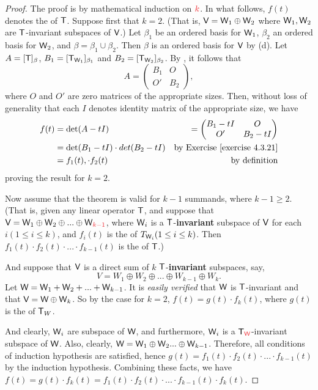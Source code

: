\begin{proof}
The proof is by mathematical induction on \(\RED{k}\).
In what follows, \(f(t)\) denotes the \CPOLY{} of \(\textsf{T}\).
Suppose first that \(k = 2\).
(That is, \(\textsf{V} = \textsf{W}_1 \oplus \textsf{W}_2\) where \(\textsf{W}_1, \textsf{W}_2\) are \(\textsf{T}\)-invariant subspaces of \(\textsf{V}\).)
Let \(\beta_1\) be an ordered basis for \(\textsf{W}_1\), \(\beta_2\) an ordered basis for \(\textsf{W}_2\), and \(\beta = \beta_1 \cup \beta_2\).
Then \(\beta\) is an ordered basis for \(\textsf{V}\) by (d).
Let \(A = [\textsf{T}]_{\beta}\), \(B_1 = [\textsf{T}_{\textsf{W}_1}]_{\beta_1}\) and \(B_2 = [\textsf{T}_{\textsf{W}_2}]_{\beta_2}\).
By , it follows that
\[
    A = \begin{pmatrix}
        B_1 & O \\
        O' & B_2
    \end{pmatrix},
\]
where \(O\) and \(O'\) are zero matrices of the appropriate sizes.
Then, without loss of generality that each \(I\) denotes identity matrix of the appropriate size, we have
\begin{align*}
    f(t) & = \det(A - tI) & = \begin{pmatrix} B_1 - tI & O \\ O' & B_2 - tI \end{pmatrix}\\
         & = \det(B_1 - tI) \cdot det(B_2 - tI) & \text{by \EXEC{4.3.21}} \\
         & = f_1(t), \cdot f_2(t) & \text{by definition}
\end{align*}
proving the result for \(k = 2\).

Now assume that the theorem is valid for \(k - 1\) summands, where \(k - 1 \ge 2\).
(That is, given any linear operator \(\textsf{T}\), and suppose that \(\V = \W_1 \oplus \W_2 \oplus ... \oplus \W_{\RED{k - 1}}\), where \(\textsf{W}_i\) is a \(\textsf{T}\)-\textbf{invariant} subspace of \(\textsf{V}\) for each \(i (1 \le i \le k)\), and \(f_i(t)\) is the \CPOLY{} of \(T_{\textsf{W}_i} (1 \le i \le k)\).
Then \(f_1(t) \cdot f_2(t) \cdot ... \cdot f_{k - 1}(t)\) is the \CPOLY{} of \(\textsf{T}\).)

And suppose that \(\textsf{V}\) is a direct sum of \(k\) \(\textsf{T}\)-\textbf{invariant}\RED{*} subspaces, say,
\[
    V = W_1 \oplus W_2 \oplus ... \oplus W_{k - 1} \oplus W_k.
\]
Let \(\textsf{W} = \textsf{W}_1 + \textsf{W}_2 + ... + \textsf{W}_{k - 1}\).
It is \emph{easily verified} that \(\textsf{W}\) is \(\textsf{T}\)-invariant and that \(\textsf{V} = \textsf{W} \oplus \textsf{W}_k\).
So by the case for \(k = 2\), \(f(t) = g(t) \cdot f_k(t)\), where \(g(t)\) is the \CPOLY{} of \(\textsf{T}_W\).

\RED{**}And clearly, \(\textsf{W}_i\) are subspace of \(\textsf{W}\), and furthermore, \(\textsf{W}_i\) is a \(\T_{\RED{\W}}\)-invariant subspace of \(\textsf{W}\).
Also, clearly, \(\textsf{W} = \textsf{W}_1 \oplus \textsf{W}_2 ... \oplus \textsf{W}_{k - 1}\).
Therefore, all conditions of induction hypothesis are satisfied, hence \(g(t) = f_1(t) \cdot f_2(t) \cdot ... \cdot f_{k - 1}(t)\) by the induction hypothesis.
Combining these facts, we have \(f(t) = g(t) \cdot f_k(t) = f_1(t) \cdot f_2(t) \cdot ... \cdot f_{k - 1}(t) \cdot f_k(t)\).
\end{proof}

